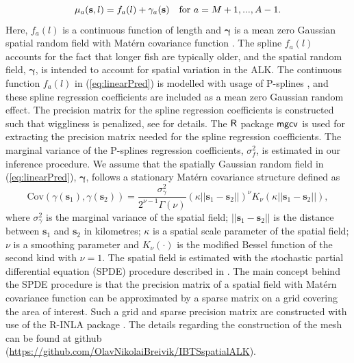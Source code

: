 \documentclass[a4paper 12pt]{article}
\numberwithin{equation}{section}
\newcommand{\mgcv}{\textnormal{\sffamily mgcv}\xspace}
\newcommand{\R}{\textnormal{\sffamily R}\xspace}
\begin{document}
\begin{equation}\label{eq:linearPred}
\mu_a({\bf s},l) = f_a(l) + \gamma_a({\bf s}) \vspace{ 4mm} \ \ \ \text{for } a =M+1,...,A-1.
\end{equation}
Here, $ f_a(l)$ is a continuous function of length and $\pmb{\gamma}$ is a mean zero Gaussian spatial random field with Mat\'{e}rn covariance function \citep{stein2012interpolation}. The spline $f_a (l)$ accounts for the fact that longer fish are typically older, and the spatial random field, $\pmb{\gamma}$, is intended to account for spatial variation in the ALK. The continuous function $f_a(l)$ in (\ref{eq:linearPred}) is modelled with usage of P-splines \citep{wood2017generalized}, and these spline regression coefficients are included as a mean zero Gaussian random effect. The precision matrix for the spline regression coefficients is constructed such that wiggliness is penalized, see \citet[page 239]{wood2017generalized} for details. The $\R$ package $\mgcv$ \citep{wood2015package} is used for extracting the precision matrix needed for the spline regression coefficients. The marginal variance of the P-splines regression coefficients, $\sigma_f^2$, is estimated in our inference procedure. We assume that the spatially Gaussian random field in (\ref{eq:linearPred}), $\pmb{\gamma}$, follows a stationary Mat\'{e}rn covariance structure defined as
\begin{equation}\label{eq:matern}
 \text{Cov}(\gamma(\mathbf{s}_1),\gamma(\mathbf{s}_2)) = \frac{\sigma^2_{\gamma}}{2^{\nu-1}\Gamma(\nu)}(\kappa||\mathbf{s}_1 -\mathbf{s}_2||)^{\nu}K_{\nu}(\kappa||\mathbf{s}_1-\mathbf{s}_2||),
\end{equation}
where $\sigma^2_{\gamma}$ is the marginal variance of the spatial field; $||\mathbf{s}_1-\mathbf{s}_2||$ is the distance between $\mathbf{s}_1$ and $\mathbf{s}_2$ in kilometres; $\kappa$ is a spatial scale parameter of the spatial field; $\nu$ is a smoothing parameter and $K_{\nu}(\cdot)$ is the modified Bessel function of the second kind with $\nu = 1$.  The spatial field is estimated with the stochastic partial differential equation (SPDE) procedure described in \citet{lindgren2011explicit}. The main concept behind the SPDE procedure is that the precision matrix of a spatial field with Mat\'{e}rn  covariance function can be approximated by a sparse matrix on a grid covering the area of interest. Such a grid and sparse precision matrix are constructed with use of the R-INLA package \citep{rue2009approximate}. The details regarding the construction of the mesh can be found at github (\href{https://github.com/OlavNikolaiBreivik/IBTSspatialALK}{https://github.com/OlavNikolaiBreivik/IBTSspatialALK}).
\end{document}
